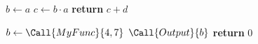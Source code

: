     \State $ b \gets a $
    \State $ c \gets b \cdot a $
    \State \textbf{return} $ c + d $
\EndFunction

    \State $b \gets \Call{MyFunc}{4, 7} $
    \State $ \Call{Output}{b} $
    \State \textbf{return} $ 0 $
\EndFunction